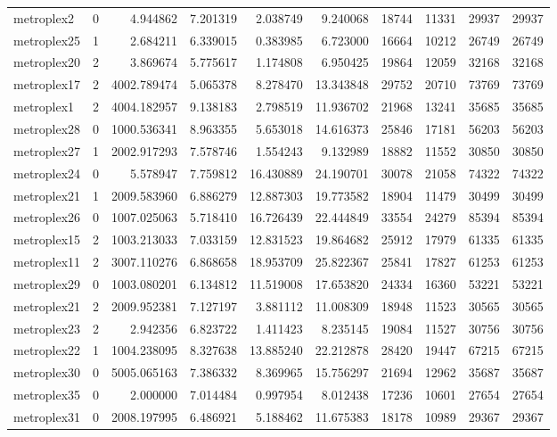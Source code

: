 \begin{longtable}{|l|r|r|r|r|r|r|r|r|r|}
metroplex2 & 0 & 4.944862 & 7.201319 & 2.038749 & 9.240068 & 18744 & 11331 & 29937 & 29937 \\
metroplex25 & 1 & 2.684211 & 6.339015 & 0.383985 & 6.723000 & 16664 & 10212 & 26749 & 26749 \\
metroplex20 & 2 & 3.869674 & 5.775617 & 1.174808 & 6.950425 & 19864 & 12059 & 32168 & 32168 \\
metroplex17 & 2 & 4002.789474 & 5.065378 & 8.278470 & 13.343848 & 29752 & 20710 & 73769 & 73769 \\
metroplex1 & 2 & 4004.182957 & 9.138183 & 2.798519 & 11.936702 & 21968 & 13241 & 35685 & 35685 \\
metroplex28 & 0 & 1000.536341 & 8.963355 & 5.653018 & 14.616373 & 25846 & 17181 & 56203 & 56203 \\
metroplex27 & 1 & 2002.917293 & 7.578746 & 1.554243 & 9.132989 & 18882 & 11552 & 30850 & 30850 \\
metroplex24 & 0 & 5.578947 & 7.759812 & 16.430889 & 24.190701 & 30078 & 21058 & 74322 & 74322 \\
metroplex21 & 1 & 2009.583960 & 6.886279 & 12.887303 & 19.773582 & 18904 & 11479 & 30499 & 30499 \\
metroplex26 & 0 & 1007.025063 & 5.718410 & 16.726439 & 22.444849 & 33554 & 24279 & 85394 & 85394 \\
metroplex15 & 2 & 1003.213033 & 7.033159 & 12.831523 & 19.864682 & 25912 & 17979 & 61335 & 61335 \\
metroplex11 & 2 & 3007.110276 & 6.868658 & 18.953709 & 25.822367 & 25841 & 17827 & 61253 & 61253 \\
metroplex29 & 0 & 1003.080201 & 6.134812 & 11.519008 & 17.653820 & 24334 & 16360 & 53221 & 53221 \\
metroplex21 & 2 & 2009.952381 & 7.127197 & 3.881112 & 11.008309 & 18948 & 11523 & 30565 & 30565 \\
metroplex23 & 2 & 2.942356 & 6.823722 & 1.411423 & 8.235145 & 19084 & 11527 & 30756 & 30756 \\
metroplex22 & 1 & 1004.238095 & 8.327638 & 13.885240 & 22.212878 & 28420 & 19447 & 67215 & 67215 \\
metroplex30 & 0 & 5005.065163 & 7.386332 & 8.369965 & 15.756297 & 21694 & 12962 & 35687 & 35687 \\
metroplex35 & 0 & 2.000000 & 7.014484 & 0.997954 & 8.012438 & 17236 & 10601 & 27654 & 27654 \\
metroplex31 & 0 & 2008.197995 & 6.486921 & 5.188462 & 11.675383 & 18178 & 10989 & 29367 & 29367 \\

\end{longtable}
